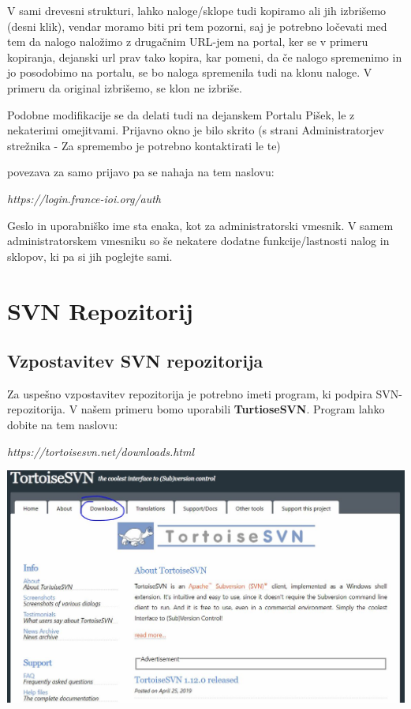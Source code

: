 \documentclass[11pt]{article} %
\begin{document}
V sami drevesni strukturi, lahko naloge/sklope tudi kopiramo ali jih izbrišemo (desni klik), vendar moramo biti pri tem pozorni, saj je potrebno ločevati med tem da nalogo naložimo z drugačnim URL-jem na portal, ker se v primeru kopiranja, dejanski url prav tako kopira, kar pomeni, da če nalogo spremenimo in jo posodobimo na portalu, se bo naloga spremenila tudi na klonu naloge. V primeru da original izbrišemo, se klon ne izbriše.

Podobne modifikacije se da delati tudi na dejanskem Portalu Pišek, le z nekaterimi omejitvami.
Prijavno okno je bilo skrito (s strani Administratorjev strežnika - Za spremembo je potrebno kontaktirati le te)

povezava za samo prijavo pa se nahaja na tem naslovu:
\begin{center}
\textit{https://login.france-ioi.org/auth}
\end{center}
Geslo in uporabniško ime sta enaka, kot za administratorski vmesnik.
V samem administratorskem vmesniku so še nekatere dodatne funkcije/lastnosti nalog in sklopov, ki pa si jih poglejte sami.


\pagebreak
\section{SVN Repozitorij}

\subsection{Vzpostavitev SVN repozitorija}
Za uspešno vzpostavitev repozitorija je potrebno imeti program, ki podpira SVN-repozitorija.
V našem primeru bomo uporabili \textbf{TurtioseSVN}.
Program lahko dobite na tem naslovu:\\
\begin{center}
\textit{https://tortoisesvn.net/downloads.html}\\
\end{center}

\includegraphics[scale=0.4]{turtoise_svn}\\
\end{document}
